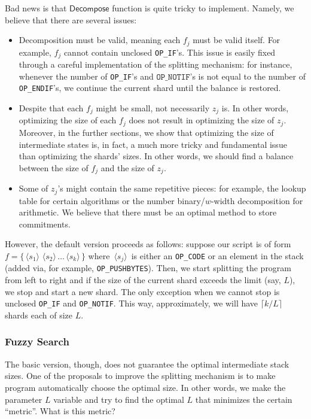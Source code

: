 \documentclass{iacrtrans}
\newcommand{\elem}[1]{\, \langle #1 \rangle \,}
\begin{document}
Bad news is that $\mathsf{Decompose}$ function is quite tricky to implement.
Namely, we believe that there are several issues:
\begin{itemize}
    \item Decomposition must be valid, meaning each $f_j$ must be valid itself.
    For example, $f_j$ cannot contain unclosed \texttt{OP\_IF}'s. This issue is
    easily fixed through a careful implementation of the splitting mechanism:
    for instance, whenever the number of \texttt{OP\_IF}'s and
    $\texttt{OP\_NOTIF}$'s is not equal to the number of \texttt{OP\_ENDIF}'s,
    we continue the current shard until the balance is restored.
    \item Despite that each $f_j$ might be small, not necessarily $z_j$ is. In
    other words, optimizing the size of each $f_j$ does not result in optimizing
    the size of $z_j$. Moreover, in the further sections, we show that
    optimizing the size of intermediate states is, in fact, a much more tricky
    and fundamental issue than optimizing the shards' sizes. In other words, we
    should find a balance between the size of $f_j$ and the size of $z_j$.
    \item Some of $z_j$'s might contain the same repetitive pieces: for example,
    the lookup table for certain algorithms or the number binary/$w$-width
    decomposition for arithmetic. We believe that there must be an optimal
    method to store commitments.
\end{itemize}

However, the default version proceeds as follows: suppose our script is of form
$f = \{ \elem{s_1} \elem{s_2} \ldots \elem{s_k} \}$ where $\elem{s_j}$ is either
an \texttt{OP\_CODE} or an element in the stack (added via, for example,
\texttt{OP\_PUSHBYTES}). Then, we start splitting the program from left to right
and if the size of the current shard exceeds the limit (say, $L$), we stop and
start a new shard. The only exception when we cannot stop is unclosed
\texttt{OP\_IF} and \texttt{OP\_NOTIF}. This way, approximately, we will have
$\lceil k/L \rceil$ shards each of size $L$.

\subsubsection{Fuzzy Search}

The basic version, though, does not guarantee the optimal intermediate stack
sizes. One of the proposals to improve the splitting mechanism is to make
program automatically choose the optimal size. In other words, we make the
parameter $L$ variable and try to find the optimal $L$ that minimizes the
certain ``metric''. What is this metric?
\end{document}
